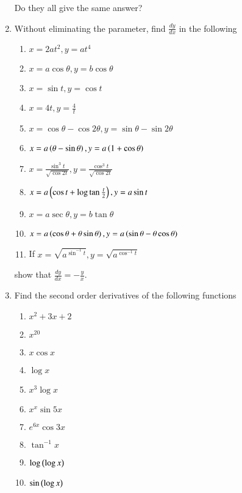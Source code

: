 \begin{enumerate}[label=\arabic*.,ref=\thesubsection.\theenumi]
\begin{enumerate}
\end{enumerate}
%
Do they all give the same answer?
\item Without eliminating the parameter, find $\frac{dy}{dx}$ in the following
%
\begin{enumerate}
\item
$
x = 2at^2, y = at^4
$
\item
$
x = a\cos\theta, y =b\cos \theta
$
\item
$
x = \sin t, y =\cos t
$
\item
$
x = 4t, y = \frac{4}{t}
$
\item
$
x = \cos \theta - \cos 2\theta, y = \sin \theta  - \sin 2\theta
$
\item
$
x = a \left(\theta - \sin \theta\right), y = a\left(1+\cos \theta\right)
$
\item
$
x = \frac{\sin ^3 t}{\sqrt{\cos 2t}}, y =\frac{\cos ^3 t}{\sqrt{\cos 2t}}
$
\item
$
x = a\left(\cos t + \log \tan \frac{t}{2}\right) , y = a \sin t
$
\item
$
x = a\sec \theta , y = b \tan \theta
$
\item
$
x = a\left(\cos \theta + \theta \sin \theta\right), y = a\left(\sin \theta - \theta \cos \theta\right)
$
\item If 
$
x = \sqrt{a^{\sin^{-1}t}}, y = \sqrt{a^{\cos^{-1}t}}
$
\end{enumerate}
%
show that $\frac{dy}{dx} = -\frac{y}{x}$.
%
\item Find the second order derivatives of the following functions
\begin{enumerate}
\item
$
x^2+3x+2
$
\item
$
x^{20}
$
\item
$
x\cos x
$
\item
$
\log x
$
\item
$
x^3\log x
$
\item
$
x^x\sin 5x
$
\item
$
e^{6x}\cos 3x
$
\item
$
\tan ^{-1}x
$
\item
$
\log \left(\log x\right)
$
\item
$
\sin\left(\log x\right)
$


\end{enumerate}
\end{enumerate}
